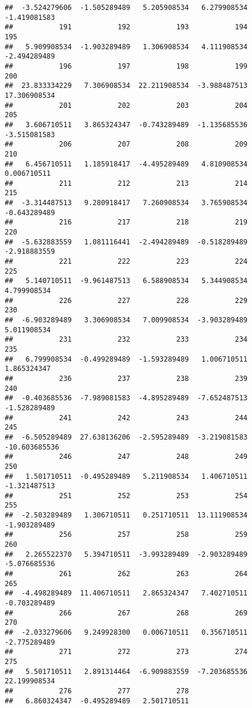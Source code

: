 \documentclass[
]{article}
\begin{document}
\begin{verbatim}
##  -3.524279606  -1.505289489   5.205908534   6.279908534  -1.419081583 
##           191           192           193           194           195 
##   5.909908534  -1.903289489   1.306908534   4.111908534  -2.494289489 
##           196           197           198           199           200 
##  23.833334229   7.306908534  22.211908534  -3.988487513  17.306908534 
##           201           202           203           204           205 
##   3.606710511   3.865324347  -0.743289489  -1.135685536  -3.515081583 
##           206           207           208           209           210 
##   6.456710511   1.185918417  -4.495289489   4.810908534   0.006710511 
##           211           212           213           214           215 
##  -3.314487513   9.280918417   7.260908534   3.765908534  -0.643289489 
##           216           217           218           219           220 
##  -5.632883559   1.081116441  -2.494289489  -0.518289489  -2.918883559 
##           221           222           223           224           225 
##   5.140710511  -9.961487513   6.588908534   5.344908534   4.799908534 
##           226           227           228           229           230 
##  -6.903289489   3.306908534   7.009908534  -3.903289489   5.011908534 
##           231           232           233           234           235 
##   6.799908534  -0.499289489  -1.593289489   1.006710511   1.865324347 
##           236           237           238           239           240 
##  -0.403685536  -7.989081583  -4.895289489  -7.652487513  -1.528289489 
##           241           242           243           244           245 
##  -6.505289489  27.638136206  -2.595289489  -3.219081583 -10.603685536 
##           246           247           248           249           250 
##   1.501710511  -0.495289489   5.211908534   1.406710511  -1.321487513 
##           251           252           253           254           255 
##  -2.503289489   1.306710511   0.251710511  13.111908534  -1.903289489 
##           256           257           258           259           260 
##   2.265522370   5.394710511  -3.993289489  -2.903289489  -5.076685536 
##           261           262           263           264           265 
##  -4.498289489  11.406710511   2.865324347   7.402710511  -0.703289489 
##           266           267           268           269           270 
##  -2.033279606   9.249928300   0.006710511   0.356710511  -2.775289489 
##           271           272           273           274           275 
##   5.501710511   2.891314464  -6.909883559  -7.203685536  22.199908534 
##           276           277           278 
##   6.860324347  -0.495289489   2.501710511
\end{verbatim}
\end{document}
